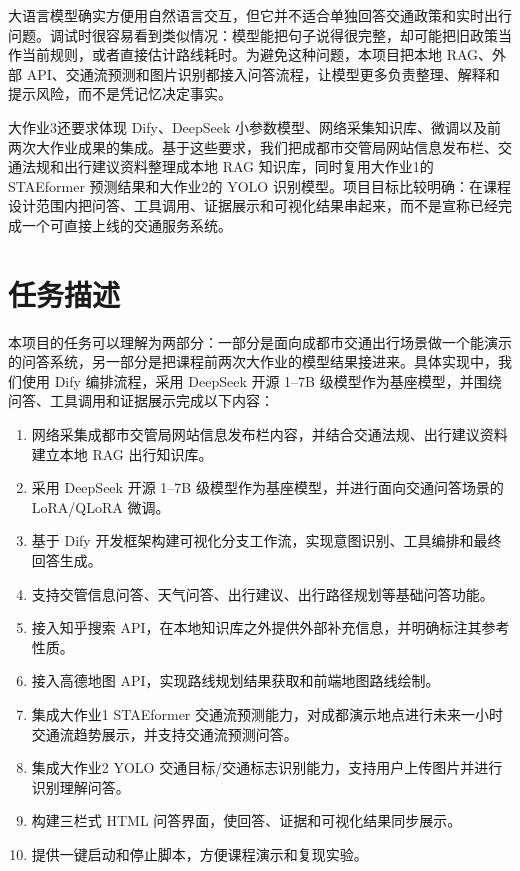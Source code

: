 \documentclass[bwprint]{report}
\begin{document}
大语言模型确实方便用自然语言交互，但它并不适合单独回答交通政策和实时出行问题。调试时很容易看到类似情况：模型能把句子说得很完整，却可能把旧政策当作当前规则，或者直接估计路线耗时。为避免这种问题，本项目把本地 RAG、外部 API、交通流预测和图片识别都接入问答流程，让模型更多负责整理、解释和提示风险，而不是凭记忆决定事实。

大作业3还要求体现 Dify、DeepSeek 小参数模型、网络采集知识库、微调以及前两次大作业成果的集成。基于这些要求，我们把成都市交管局网站信息发布栏、交通法规和出行建议资料整理成本地 RAG 知识库，同时复用大作业1的 STAEformer 预测结果和大作业2的 YOLO 识别模型。项目目标比较明确：在课程设计范围内把问答、工具调用、证据展示和可视化结果串起来，而不是宣称已经完成一个可直接上线的交通服务系统。

\section{任务描述}
本项目的任务可以理解为两部分：一部分是面向成都市交通出行场景做一个能演示的问答系统，另一部分是把课程前两次大作业的模型结果接进来。具体实现中，我们使用 Dify 编排流程，采用 DeepSeek 开源 1--7B 级模型作为基座模型，并围绕问答、工具调用和证据展示完成以下内容：

\begin{enumerate}
    \item 网络采集成都市交管局网站信息发布栏内容，并结合交通法规、出行建议资料建立本地 RAG 出行知识库。
    \item 采用 DeepSeek 开源 1--7B 级模型作为基座模型，并进行面向交通问答场景的 LoRA/QLoRA 微调。
    \item 基于 Dify 开发框架构建可视化分支工作流，实现意图识别、工具编排和最终回答生成。
    \item 支持交管信息问答、天气问答、出行建议、出行路径规划等基础问答功能。
    \item 接入知乎搜索 API，在本地知识库之外提供外部补充信息，并明确标注其参考性质。
    \item 接入高德地图 API，实现路线规划结果获取和前端地图路线绘制。
    \item 集成大作业1 STAEformer 交通流预测能力，对成都演示地点进行未来一小时交通流趋势展示，并支持交通流预测问答。
    \item 集成大作业2 YOLO 交通目标/交通标志识别能力，支持用户上传图片并进行识别理解问答。
    \item 构建三栏式 HTML 问答界面，使回答、证据和可视化结果同步展示。
    \item 提供一键启动和停止脚本，方便课程演示和复现实验。
\end{enumerate}
\end{document}
